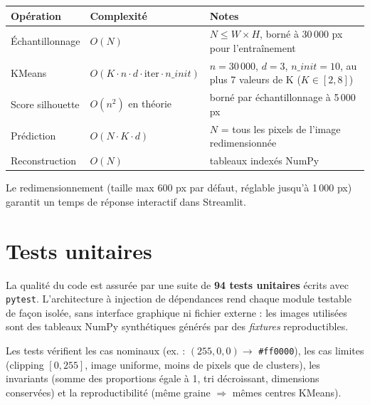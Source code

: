 \documentclass[11pt,a4paper]{article}
\begin{document}
\begin{table}[h]
\centering
\small
\begin{tabular}{@{}p{5cm}p{6.5cm}p{5cm}@{}}
\toprule
\textbf{Opération} & \textbf{Complexité} & \textbf{Notes} \\
\midrule
Échantillonnage &
$O(N)$ &
$N \le W \times H$, borné à 30\,000 px pour l'entraînement \\
KMeans &
$O(K \cdot n \cdot d \cdot \text{iter} \cdot n\_init)$ &
$n = 30\,000$, $d = 3$, $n\_init = 10$, au plus 7 valeurs de K ($K \in [2,8]$) \\
Score silhouette &
$O(n^2)$ en théorie &
borné par échantillonnage à 5\,000 px \\
Prédiction &
$O(N \cdot K \cdot d)$ &
$N$ = tous les pixels de l'image redimensionnée \\
Reconstruction &
$O(N)$ &
tableaux indexés NumPy \\
\bottomrule
\end{tabular}
\end{table}

Le redimensionnement (taille max 600 px par défaut, réglable jusqu'à
1\,000 px) garantit un temps de réponse interactif dans Streamlit.

\section{Tests unitaires}

La qualité du code est assurée par une suite de \textbf{94 tests
unitaires} écrits avec \texttt{pytest}. L'architecture à injection de
dépendances rend chaque module testable de façon isolée, sans interface
graphique ni fichier externe : les images utilisées sont des tableaux
NumPy synthétiques générés par des \emph{fixtures} reproductibles.

Les tests vérifient les cas nominaux (ex. : $(255,0,0) \rightarrow$
\texttt{\#ff0000}), les cas limites (clipping $[0,255]$, image uniforme,
moins de pixels que de clusters), les invariants (somme des proportions
égale à 1, tri décroissant, dimensions conservées) et la
reproductibilité (même graine $\Rightarrow$ mêmes centres KMeans).
\end{document}
